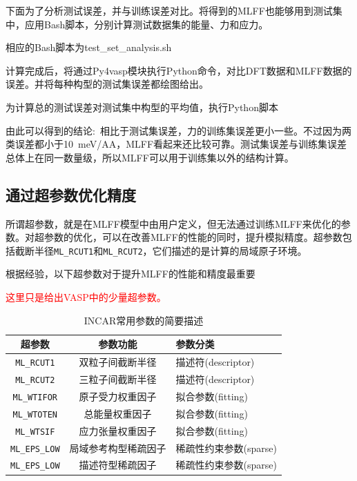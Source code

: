 下面为了分析测试误差，并与训练误差对比。将得到的\textrm{MLFF}也能够用到测试集中，应用\textrm{Bash}脚本，分别计算测试数据集的能量、力和应力。

相应的\textrm{Bash}脚本为\textrm{test\_set\_analysis.sh}

计算完成后，将通过\textrm{Py4vasp}模块执行\textrm{Python}命令，对比\textrm{DFT}数据和\textrm{MLFF}数据的误差。并将每种构型的测试集误差都绘图给出。

为计算总的测试误差对测试集中构型的平均值，执行\textrm{Python}脚本

由此可以得到的结论:~相比于测试集误差，力的训练集误差更小一些。不过因为两类误差都小于\textrm{10~meV/AA}，\textrm{MLFF}看起来还比较可靠。测试集误差与训练集误差总体上在同一数量级，所以\textrm{MLFF}可以用于训练集以外的结构计算。

\subsection{通过超参数优化精度}
所谓超参数，就是在\textrm{MLFF}模型中由用户定义，但无法通过训练\textrm{MLFF}来优化的参数。对超参数的优化，可以在改善\textrm{MLFF}的性能的同时，提升模拟精度。超参数包括截断半径\texttt{ML\_RCUT1}和\texttt{ML\_RCUT2}，它们描述的是计算的局域原子环境。%

根据经验，以下超参数对于提升\textrm{MLFF}的性能和精度最重要

\textcolor{red}{这里只是给出\textrm{VASP}中的少量超参数。}
\begin{table}[h!]
    \centering
    \begin{tabular*}{\textwidth}{@{\extracolsep{\fill}}c@{\extracolsep{\fill}}|@{\extracolsep{\fill}}c}
        \toprule
	超参数 &参数功能 &参数分类\\
\midrule
\texttt{ML\_RCUT1} & 双粒子间截断半径 &描述符\textrm{(descriptor)}\\
\texttt{ML\_RCUT2} & 三粒子间截断半径 &描述符\textrm{(descriptor)}\\
\texttt{ML\_WTIFOR} & 原子受力权重因子 &拟合参数\textrm{(fitting)}\\
\texttt{ML\_WTOTEN} & 总能量权重因子 &拟合参数\textrm{(fitting)}\\
\texttt{ML\_WTSIF} & 应力张量权重因子 &拟合参数\textrm{(fitting)}\\
\texttt{ML\_EPS\_LOW} & 局域参考构型稀疏因子 &稀疏性约束参数\textrm{(sparse)}\\
\texttt{ML\_EPS\_LOW} & 描述符型稀疏因子 &稀疏性约束参数\textrm{(sparse)}\\
        \bottomrule
    \end{tabular*}
    \caption{\textrm{INCAR}常用参数的简要描述}
\label{Tab:Hyperparameter-Tag}
\end{table}

